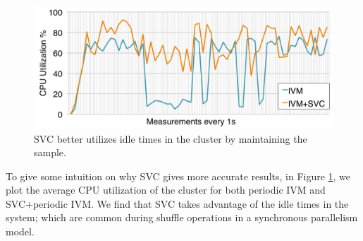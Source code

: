 \begin{figure}[t]
\centering
\includegraphics[scale=0.12]{exp/con_7.pdf}
 \caption{SVC better utilizes idle times in the cluster by maintaining the sample.\label{conv-5}} 
\end{figure}
To give some intuition on why SVC gives more accurate results, in Figure \ref{conv-5}, we plot the average CPU utilization of the cluster for both periodic IVM and SVC+periodic IVM. 
We find that SVC takes advantage of the idle times in the system; which are common during shuffle operations in a synchronous parallelism model.

